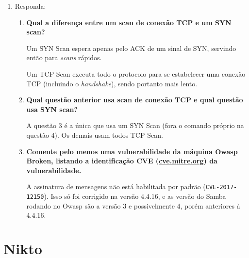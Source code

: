 \documentclass{article}
\newcommand{\code}[1]{\texttt{#1}}
\newcommand{\img}[1]{%
    \texttt{[image: \#1]}
}
\begin{document}
\begin{enumerate}
            \img{imgs/q1_4_1}

            2º Comando: \code{nmap -sP 10.1.2.*}. Esse comando faz um
            \textit{scan}, mas não por portas, e sim por quais os endereços
            ativos no intervalo \code{10.1.2.0} a \code{10.1.2.255}. É possível
            identificar as duas VMs através disso.

            \img{imgs/q1_4_2}

        \item Responda:
            \begin{enumerate}
                \item \textbf{Qual a diferença entre um scan de conexão TCP e
                        um SYN scan?}

                    Um SYN Scan espera apenas pelo ACK de um sinal de SYN,
                    servindo então para \textit{scans} rápidos.

                    Um TCP Scan executa todo o protocolo para se
                    estabelecer uma conexão TCP (incluindo o
                    \textit{handshake}), sendo portanto mais lento.

                \item \textbf{Qual questão anterior usa scan de conexão TCP e
                        qual questão usa SYN scan?}

                    A questão 3 é a única que usa um SYN Scan (fora o comando
                    próprio na questão 4). Os demais usam todos TCP Scan.

                \item \textbf{Comente pelo menos uma vulnerabilidade da máquina
                        Owasp Broken, listando a identificação CVE
                        (\url{cve.mitre.org}) da vulnerabilidade.}

                    A assinatura de mensagens não está habilitada por padrão
                    (\code{CVE-2017-12150}). Isso só foi corrigido na versão
                    4.4.16, e as versão do Samba rodando no Owasp são a versão
                    3 e possivelmente 4, porém anteriores à 4.4.16.
            \end{enumerate}
    \end{enumerate}

    \section{Nikto}
\end{document}
